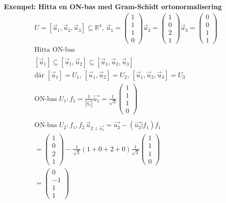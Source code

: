 \begin{multicols}{2}
\textbf{Exempel: Hitta en ON-bas med Gram-Schidt ortonormalisering}
\begin{align*}
  &U = [\vec{u}_1, \vec{u}_2, \vec{u}_3] \subseteq \mathbb{R}^4 , \,
  \vec{u}_1 = \begin{pmatrix} 1 \\ 1 \\ 1 \\ 0 \end{pmatrix}
  \vec{u}_2 = \begin{pmatrix} 1 \\ 0 \\ 2 \\ 1 \end{pmatrix}
  \vec{u}_3 = \begin{pmatrix} 0 \\ 0 \\ 1 \\ 1 \end{pmatrix} \\
  &\text{Hitta ON-bas} \\
  &\\
  &[\vec{u}_1] \subseteq [\vec{u}_1, \vec{u}_2] \subseteq [\vec{u}_1, \vec{u}_2, \vec{u}_3] \\
  &\text{där } [\vec{u}_1] = U_1, \, [\vec{u}_1, \vec{u}_2] = U_2, \, [\vec{u}_1, \vec{u}_2, \vec{u}_3] = U_3
  &\\
  &\text{ON-bas } U_1: f_1 = \frac{1}{|\vec{u_1}|} \vec{u_1} =
  \frac{1}{\sqrt{3}}\begin{pmatrix} 1 \\ 1 \\ 1 \\ 0 \end{pmatrix}  \\
  &\\
  &\text{ON-bas } U_2: f_1,f_2 \, \vec{u}_{2\perp\vec{u_1}} = \vec{u_2} - (\vec{u_2}|f_1)f_1 \\
  &= \begin{pmatrix} 1 \\ 0 \\ 2 \\ 1 \end{pmatrix} -
  \frac{1}{\sqrt{3}}(1+0+2+0)\frac{1}{\sqrt{3}}\begin{pmatrix} 1 \\ 1 \\ 1 \\ 0 \end{pmatrix} \\
  &= \begin{pmatrix} 0 \\ -1 \\ 1 \\ 1 \end{pmatrix} \\

\end{align*}
\end{multicols}

